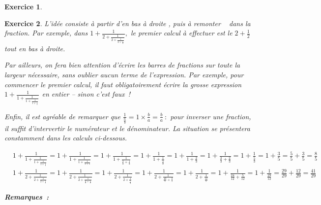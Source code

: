\documentclass[10pt]{article}
\newtheorem{exo}{Exercice}
\begin{document}
\begin{exo}
\begin{enumerate}
\medskip


\end{enumerate}

\end{exo}




\begin{exo}

L'idée consiste à \og partir d'en bas à droite \fg, puis à \og remonter \fg~{} dans la fraction. Par exemple, dans $1+\frac{1}{2
+\frac{1}{2
+\frac{1}{2+\frac{1}{2}}}},$ le premier calcul à effectuer est le $2+\frac{1}{2}$ tout en bas à droite.

\medskip

Par ailleurs, on fera bien attention d'écrire les barres de fractions sur toute la largeur nécessaire, sans oublier aucun terme de l'expression. Par exemple, pour commencer le premier calcul, il faut obligatoirement écrire la grosse expression $1+\frac{1}{1
+\frac{1}{1
+\frac{1}{1+\frac{1}{1}}}}$ en entier -- sinon c'est faux~!

\medskip

Enfin, il est agréable de remarquer que $\frac{1}{\frac{a}{b}}=1\times\frac{b}{a}=\frac{b}{a}~:$ pour inverser une fraction, il suffit d'intervertir le numérateur et le dénominateur. La situation se présentera constamment dans les calculs ci-dessous.

\medskip

\begin{align*}
&1+\frac{1}{1
+\frac{1}{1
+\frac{1}{1+\frac{1}{1}}}}
=1+\frac{1}{1
+\frac{1}{1
+\frac{1}{1+1}}}
=1+\frac{1}{1
+\frac{1}{\frac{2}{2}
+\frac{1}{2}}}
=1+\frac{1}{1
+\frac{1}{\frac{3}{2}
}}
=1+\frac{1}{1
+\frac{2}{3}
}
=1+\frac{1}{\frac{3}{3}
+\frac{2}{3}
}
=1+\frac{1}{
\frac{5}{3}
}
=1+\frac{3}{5}=\frac{5}{5}+\frac{3}{5}=\frac{8}{5}\\
&1+\frac{1}{2
+\frac{1}{2
+\frac{1}{2+\frac{1}{2}}}}
=1+\frac{1}{2
+\frac{1}{2
+\frac{1}{\frac{4}{2}+\frac{1}{2}}}}
=1+\frac{1}{2
+\frac{1}{2
+\frac{1}{\frac{5}{2}}}}
=1+\frac{1}{2
+\frac{1}{\frac{10}{5}
+\frac{2}{5}}}
=1+\frac{1}{2
+\frac{1}{\frac{12}{5}
}}
=1+\frac{1}{\frac{24}{12}
+\frac{5}{12}}
=1+\frac{1}{\frac{29}{12}}
=\frac{29}{29}+\frac{12}{29}
=\frac{41}{29}
\end{align*}

\medskip

\textbf{Remarques~:}


\end{exo}
\end{document}
